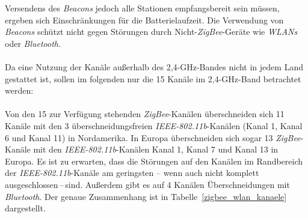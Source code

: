                 Versendens des \emph{Beacons} jedoch alle Stationen empfangsbereit sein müssen, ergeben sich 
                Einschränkungen für die Batterielaufzeit. Die Verwendung von \emph{Beacons} schützt nicht gegen
                Störungen durch Nicht-\emph{ZigBee}-Geräte wie \emph{WLANs} oder \emph{Bluetooth}.\\
                \\
                Da eine Nutzung der Kanäle außerhalb des 2,4-GHz-Bandes nicht in jedem Land gestattet ist,
                sollen im folgenden nur die 15 Kanäle im 2,4-GHz-Band betrachtet werden:\\
                \\
                Von den 15 zur Verfügung stehenden \emph{ZigBee}-Kanälen überschneiden sich 11 Kanäle mit den 3 überschneidungsfreien 
                \emph{IEEE-802.11b}-Kanälen (Kanal 1, Kanal 6 und Kanal 11) in Nordamerika. In Europa überschneiden sich sogar 13 \emph{ZigBee}-Kanäle
                mit den \emph{IEEE-802.11b}-Kanälen Kanal 1, Kanal 7 und Kanal 13 in Europa. Es ist zu 
                erwarten, dass die Störungen auf den Kanälen im Randbereich der \emph{IEEE-802.11b}-Kanäle am geringsten --
                wenn auch nicht komplett ausgeschlossen\,--\,sind.
                Außerdem gibt es auf 4 Kanälen Überschneidungen mit \emph{Bluetooth}. Der genaue Zusammenhang ist
                in Tabelle~\ref{zigbee_wlan_kanaele} dargestellt.




